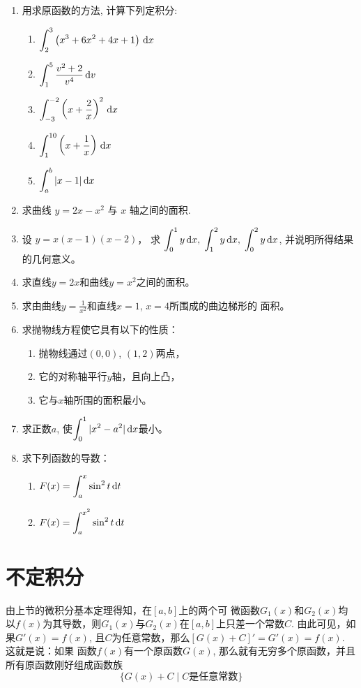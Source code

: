 \begin{ex}
\begin{enumerate}
\item 用求原函数的方法, 计算下列定积分:
\begin{multicols}{2}
\begin{enumerate}
 \item $\displaystyle\int_{2}^{3}\left(x^{3}+6 x^{2}+4 x+1\right) \,{\rm d} x$
\item $\displaystyle\int_{1}^{5} \dfrac{v^{2}+2}{v^{4}} \,{\rm d} v$
\item $\displaystyle\int_{-3}^{-2}\left(x+\dfrac{2}{x}\right)^{2} \,{\rm d} x$
\item $\displaystyle\int_{1}^{10}\left(x+\dfrac{1}{x}\right) \,{\rm d} x$
\item $\displaystyle\int_{a}^{b}|x-1| \,{\rm d} x$
\end{enumerate}
\end{multicols}
\item 求曲线 $y=2 x-x^{2}$ 与 $x$ 轴之间的面积.
\item 设 $y=x(x-1)(x-2)$，
求 $\displaystyle\int_{0}^{1} y \,{\rm d} x,\; \displaystyle\int_{1}^{2} y\,{\rm d} x,\; \displaystyle\int_{0}^{2} y \,{\rm d} x$,
并说明所得结果的几何意义。

\item 求直线$y=2x$和曲线$y=x^2$之间的面积。
\item 求由曲线$y=\frac{1}{x^2}$和直线$x=1$, $x=4$所围成的曲边梯形的
面积。
\item 求抛物线方程使它具有以下的性质：
\begin{enumerate}
\item 抛物线通过$(0, 0)$, $(1, 2)$两点，
\item 它的对称轴平行$y$轴，且向上凸，
\item 它与$x$轴所围的面积最小。
\end{enumerate}

\item 求正数$a$, 使$\displaystyle\int^1_0 |x^2-a^2|\,{\rm d} x$最小。
\item 求下列函数的导数：
\begin{multicols}{2}
    \begin{enumerate}
     \item $F(x)=\displaystyle\int_{a}^{x}\sin^2 t \,{\rm d} t$
    \item $F(x)=\displaystyle\int_{a}^{x^2} \sin^2 t \,{\rm d} t$
    \end{enumerate}
    \end{multicols}
\end{enumerate}

\end{ex}

\section{不定积分}
由上节的微积分基本定理得知，在$[a,b]$上的两个可
微函数$G_1(x)$和$G_2(x)$均以$f(x)$为其导数，则$G_1(x)$与$G_2(x)$在$[a,b]$上只差一个常数$C$. 由此可见，如果$G'(x)=f(x)$, 且$C$为任意常数，那么$[G(x)+C]'=G'(x)=f(x)$. 这就是说：如果 函数$f(x)$有一个原函数$G(x)$, 那么就有无穷多个原函数，并且所有原函数刚好组成函数族
\[\{G(x)+C\;|\; C\text{是任意常数}\}\]

